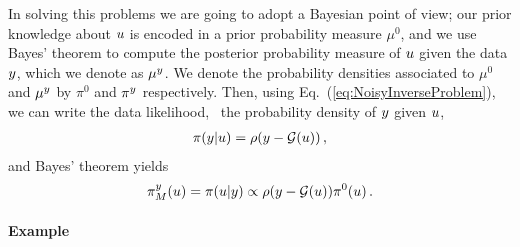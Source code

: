 In solving this problems we are going to adopt a Bayesian point of view; our
prior knowledge about $u$ is encoded in a prior probability measure
$\mu^0$, and we use Bayes' theorem to compute the posterior
probability measure of $u$ given the data $y$, which we denote as
$\mu^y$. We denote the probability densities associated to $\mu^0$ and
$\mu^y$ by $\pi^0$ and $\pi^y$ respectively. Then, using
Eq.~(\ref{eq:NoisyInverseProblem}), we can write the data likelihood,
\ie\ the probability density of $y$ given $u$,
\begin{align}
  \label{eq:YGivenUProbDensity}
  \pi(y|u) = \rho(y-\mathcal{G}(u))\, ,
\end{align}
and Bayes' theorem yields
\begin{align}
  \label{eq:BayesThmInversePosterior}
  \pi_M^y(u) = \pi(u|y) \propto \rho(y-\mathcal{G}(u)) \pi^0(u)\, .
\end{align}

\paragraph{Example}

